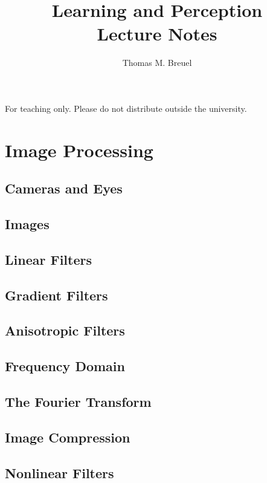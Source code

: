 \documentclass{book}
\title{Learning and Perception \\ Lecture Notes}
\author{Thomas M. Breuel}
\begin{document}
\maketitle
For teaching only.
Please do not distribute outside the university.
\tableofcontents

\part{Image Processing}

\chapter{Cameras and Eyes}


\chapter{Images}


\chapter{Linear Filters}


\chapter{Gradient Filters}


\chapter{Anisotropic Filters}


\chapter{Frequency Domain}


\chapter{The Fourier Transform}


\chapter{Image Compression}


\chapter{Nonlinear Filters}


\end{document}
